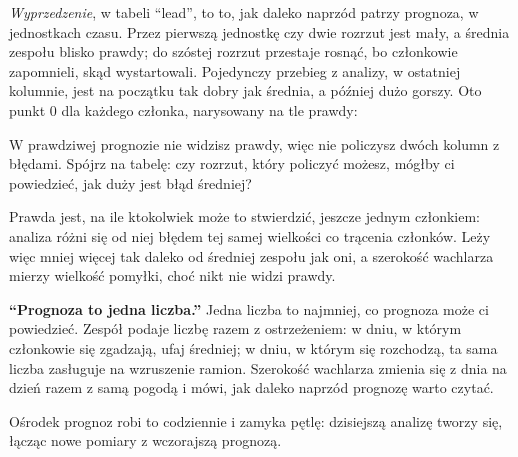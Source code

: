 

\noindent
\emph{Wyprzedzenie}, w tabeli \enquote{lead}, to to, jak daleko naprzód
patrzy prognoza, w jednostkach czasu. Przez pierwszą jednostkę czy dwie
rozrzut jest mały, a średnia zespołu blisko prawdy; do szóstej rozrzut
przestaje rosnąć, bo członkowie zapomnieli, skąd wystartowali. Pojedynczy
przebieg z analizy, w ostatniej kolumnie, jest na początku tak dobry jak
średnia, a później dużo gorszy. Oto punkt 0 dla każdego członka, narysowany
na tle prawdy:


\begin{think}
W prawdziwej prognozie nie widzisz prawdy, więc nie policzysz dwóch kolumn z
błędami. Spójrz na tabelę: czy rozrzut, który policzyć możesz, mógłby ci
powiedzieć, jak duży jest błąd średniej?
\end{think}
Prawda jest, na ile ktokolwiek może to stwierdzić, jeszcze jednym członkiem:
analiza różni się od niej błędem tej samej wielkości co trącenia członków.
Leży więc mniej więcej tak daleko od średniej zespołu jak oni, a szerokość
wachlarza mierzy wielkość pomyłki, choć nikt nie widzi prawdy.

\begin{trapbox}
\textbf{\enquote{Prognoza to jedna liczba.}} Jedna liczba to najmniej, co
prognoza może ci powiedzieć. Zespół podaje liczbę razem z ostrzeżeniem: w
dniu, w którym członkowie się zgadzają, ufaj średniej; w dniu, w którym się
rozchodzą, ta sama liczba zasługuje na wzruszenie ramion. Szerokość
wachlarza zmienia się z dnia na dzień razem z samą pogodą i mówi, jak daleko
naprzód prognozę warto czytać.
\end{trapbox}

\noindent
Ośrodek prognoz robi to codziennie i zamyka pętlę: dzisiejszą analizę tworzy
się, łącząc nowe pomiary z wczorajszą prognozą.

